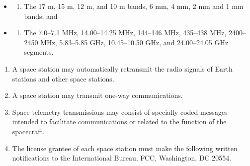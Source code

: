 \documentclass[
  letterpaper,
  DIV=11,
  numbers=noendperiod]{scrreport}
\providecommand{\tightlist}{%
  \setlength{\itemsep}{0pt}\setlength{\parskip}{0pt}}\usepackage{longtable,booktabs,array}
\begin{document}
\begin{itemize}
\item
  \begin{enumerate}
  \def\labelenumi{(\arabic{enumi})}
  \tightlist
  \item
    The 17 m, 15 m, 12 m, and 10 m bands, 6 mm, 4 mm, 2 mm and 1 mm
    bands; and
  \end{enumerate}
\item
  \begin{enumerate}
  \def\labelenumi{(\arabic{enumi})}
  \setcounter{enumi}{1}
  \tightlist
  \item
    The 7.0--7.1 MHz, 14.00--14.25 MHz, 144--146 MHz, 435--438 MHz,
    2400--2450 MHz, 5.83--5.85 GHz, 10.45--10.50 GHz, and 24.00--24.05
    GHz segments.
  \end{enumerate}
\end{itemize}

\begin{enumerate}
\def\labelenumi{(\alph{enumi})}
\setcounter{enumi}{3}
\item
  A space station may automatically retransmit the radio signals of
  Earth stations and other space stations.
\item
  A space station may transmit one-way communications.
\item
  Space telemetry transmissions may consist of specially coded messages
  intended to facilitate communications or related to the function of
  the spacecraft.
\item
  The license grantee of each space station must make the following
  written notifications to the International Bureau, FCC, Washington, DC
  20554.
\end{enumerate}
\end{document}
